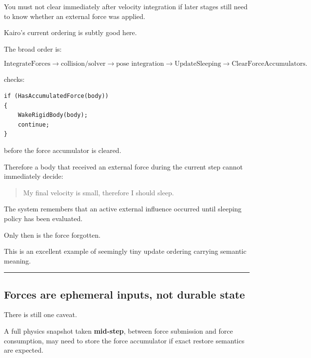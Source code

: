 \hypertarget{06-engine-ii-ch038-why-force-clearing-belongs-after-the-complete-step}{}

You must not clear immediately after velocity integration if later stages still need to know whether an external force was applied.

Kairo's current ordering is subtly good here.

The broad order is:

\[
\text{IntegrateForces}
\rightarrow
\text{collision/solver}
\rightarrow
\text{pose integration}
\rightarrow
\text{UpdateSleeping}
\rightarrow
\text{ClearForceAccumulators}.
\]

 checks:

\begin{verbatim}
if (HasAccumulatedForce(body))
{
    WakeRigidBody(body);
    continue;
}
\end{verbatim}

before the force accumulator is cleared.

Therefore a body that received an external force during the current step cannot immediately decide:

\begin{quote}
My final velocity is small, therefore I should sleep.
\end{quote}

The system remembers that an active external influence occurred until sleeping policy has been evaluated.

Only then is the force forgotten.

This is an excellent example of seemingly tiny update ordering carrying semantic meaning.

\begin{center}\rule{0.5\linewidth}{0.5pt}\end{center}

\subsection{Forces are ephemeral inputs, not durable state}\label{06-engine-ii-ch038-forces-are-ephemeral-inputs-not-durable-state}

\hypertarget{06-engine-ii-ch038-forces-are-ephemeral-inputs-not-durable-state}{}

There is still one caveat.

A full physics snapshot taken \textbf{mid-step}, between force submission and force consumption, may need to store the force accumulator if exact restore semantics are expected.

